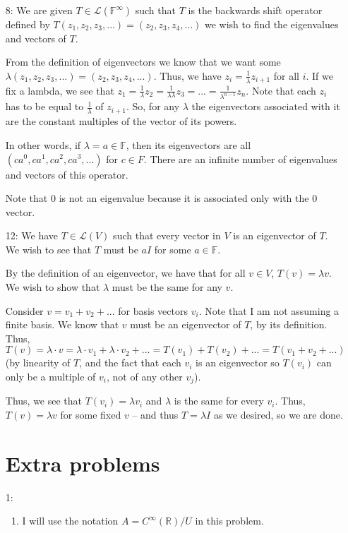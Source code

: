\documentclass[12pt]{article}
\newcommand{\R}{\mathbb{R}}
\newcommand{\F}{\mathbb{F}}
\renewcommand{\L}{\mathcal{L}}
\begin{document}
\begin{enumerate}
\item[8:]
  We are given $T \in \L(\F^{\infty})$ such that $T$ is the backwards shift operator defined by $T(z_1, z_2, z_3, ...) = (z_2, z_3, z_4, ...)$ we wish to find the eigenvalues and vectors of $T$.

  From the definition of eigenvectors we know that we want some $\lambda (z_1, z_2, z_3, ...) = (z_2, z_3, z_4, ...)$. Thus, we have $z_i = \frac{1}{\lambda} z_{i+1}$ for all $i$. If we fix a lambda, we see that $z_1 = \frac{1}{\lambda} z_2 = \frac{1}{\lambda \lambda} z_3 = ... = \frac{1}{\lambda^{n-1}} z_n$. Note that each $z_i$ has to be equal to $\frac{1}{\lambda}$ of $z_{i+1}$. So, for any $\lambda$ the eigenvectors associated with it are the constant multiples of the vector of its powers.

  In other words, if $\lambda = a \in \F$, then its eigenvectors are all $(ca^{0},ca^1, ca^2, ca^3, ...)$ for $c \in F$. There are an infinite number of eigenvalues and vectors of this operator.

  Note that $0$ is not an eigenvalue because it is associated only with the $0$ vector.

\item[12:]
  We have $T \in \L(V)$ such that every vector in $V$ is an eigenvector of $T$. We wish to see that $T$ must be $aI$ for some $a \in \F$.

  By the definition of an eigenvector, we have that for all $v \in V$, $T(v) = \lambda v$. We wish to show that $\lambda$ must be the same for any $v$.

  Consider $v = v_1 + v_2 + ...$ for basis vectors $v_i$. Note that I am not assuming a finite basis. We know that $v$ must be an eigenvector of $T$, by its definition. Thus, $T(v) = \lambda \cdot v = \lambda \cdot v_1 + \lambda \cdot v_2 + ... = T(v_1) + T(v_2) + ... = T(v_1 + v_2 + ...)$ (by linearity of $T$, and the fact that each $v_i$ is an eigenvector so $T(v_i)$ can only be a multiple of $v_i$, not of any other $v_j$). 

  Thus, we see that $T(v_i) = \lambda v_i$ and $\lambda$ is the same for every $v_i$. Thus, $T(v) = \lambda v$ for some fixed $v$ -- and thus $T = \lambda I$ as we desired, so we are done.

\section*{Extra problems}
\item[1:]
  \begin{enumerate}
  \item
    I will use the notation $A = C^{\infty}(\R) / U$ in this problem.


\end{enumerate}
\end{enumerate}
\end{document}
